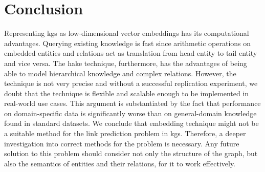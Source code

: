 \section{Conclusion}\label{sec:conclusion}

Representing \acp{kg} as low-dimensional vector embeddings has its computational advantages.
Querying existing knowledge is fast since arithmetic operations on embedded entities and relations act as translation from head entity to tail entity and vice versa.
The \ac{hake} technique, furthermore, has the advantages of being able to model hierarchical knowledge and complex relations.
However, the technique is not very precise and without a successful replication experiment, we doubt that the technique is flexible and scalable enough to be implemented in real-world use cases.
This argument is substantiated by the fact that performance on domain-specific data is significantly worse than on general-domain knowledge found in standard datasets.
We conclude that embedding technique might not be a suitable method for the link prediction problem in \acp{kg}.
Therefore, a deeper investigation into correct methods for the problem is necessary.
Any future solution to this problem should consider not only the structure of the graph, but also the semantics of entities and their relations, for it to work effectively.
